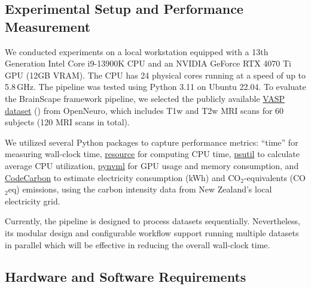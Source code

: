 \subsection{Experimental Setup and Performance Measurement}

We conducted experiments on a local workstation equipped with a 13th Generation Intel Core i9-13900K CPU 
and an NVIDIA GeForce RTX 4070 Ti GPU (12GB VRAM). 
The CPU has 24 physical cores running at a speed of up to 5.8\,GHz. 
The pipeline was tested using Python 3.11 on Ubuntu 22.04.
To evaluate the BrainScape framework pipeline, 
we selected the publicly available \href{https://openneuro.org/datasets/ds003717}{VASP dataset} (\cite{peelle2022increased}) from OpenNeuro, 
which includes T1w and T2w MRI scans for 60 subjects (120 MRI scans in total). 

We utilized several Python packages to capture performance metrics: 
``time'' for measuring wall-clock time, 
\href{https://docs.python.org/3/library/resource.html}{resource} for computing CPU time,
\href{https://pypi.org/project/psutil/}{psutil} to calculate average CPU utilization, 
\href{https://pypi.org/project/pynvml/}{pynvml} for GPU usage and memory consumption, and 
\href{https://pypi.org/project/codecarbon/}{CodeCarbon} to estimate electricity consumption (kWh) and CO$_2$-equivalents (CO$_2$eq) emissions, 
using the carbon intensity data from New Zealand's local electricity grid.

Currently, the pipeline is designed to process datasets sequentially. 
Nevertheless, its modular design and configurable workflow support running multiple datasets in parallel 
which will be effective in reducing the overall wall-clock time.


\subsection{Hardware and Software Requirements}

